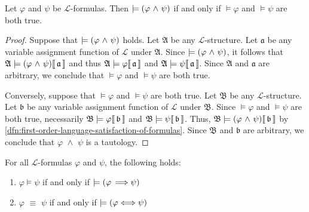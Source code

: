 \begin{thm}
     \label{thm:first-order-language-tautological-conjuncts-iff-tautological-conjunction}
    Let \( \varphi \) and \( \psi \) be \( \mathcal{L} \)-formulas. Then \( \models \mleft( \varphi \,\,{\land}\,\, \psi \mright) \) if and only if
    \( \models \varphi \) and \( \models \psi \) are both true.
\end{thm}

\begin{proof}
    Suppose that \( \models \mleft( \varphi \,\,{\land}\,\, \psi \mright) \) holds.
    Let \( \mathfrak{A} \) be any \( \mathcal{L} \)-structure.
    Let \( \mathfrak{a} \) be any variable assignment function of \( \mathcal{L} \) under \( \mathfrak{A} \).
    Since \( \models \mleft( \varphi \,\,{\land}\,\, \psi \mright) \),
    it follows that \( \folwffsatisfaction{\mathfrak{A}}{\mleft( \varphi \,\,{\land}\,\, \psi \mright)}{\mathfrak{a}} \)
    and thus \(  \mathfrak{A} \models \varphi\llbracket\, \mathfrak{a} \,\rrbracket \) and \(  \mathfrak{A} \models \psi\llbracket\, \mathfrak{a} \,\rrbracket \).
    Since \( \mathfrak{A} \) and \( \mathfrak{a} \) are arbitrary, we conclude that \( \models \varphi \) and \( \models \psi \) are both true.

    \vspace{0.3cm}
    \noindent
    Conversely, suppose that \( \models \varphi \) and \( \models \psi \) are both true.
    Let \( \mathfrak{B} \) be any \( \mathcal{L} \)-structure.
    Let \( \mathfrak{b} \) be any variable assignment function of \( \mathcal{L} \) under \( \mathfrak{B} \).
    Since \( \models \varphi \) and \( \models \psi \) are both true, necessarily \(  \mathfrak{B} \models \varphi\llbracket\, \mathfrak{b} \,\rrbracket \)
    and \(  \mathfrak{B} \models \psi\llbracket\, \mathfrak{b} \,\rrbracket \).
    Thus, \( \folwffsatisfaction{\mathfrak{B}}{\mleft( \varphi \,\,{\land}\,\, \psi \mright)}{\mathfrak{b}} \)
    by \cref{dfn:first-order-language-satisfaction-of-formulas}.
    Since \( \mathfrak{B} \) and \( \mathfrak{b} \) are arbitrary, we conclude that \( \varphi \,\,{\land}\,\, \psi \) is a tautology.
\end{proof}

\begin{thm}
     \label{thm:first-order-language-equivalent-formulations-of-logical-consequence-and-logical-equivalence}
    For all \( \mathcal{L} \)-formulas \( \varphi \) and \( \psi \), the following holds:
    \begin{enumerate}[topsep=2pt,label=\textup{\texttt{(\alph*)}}]
        \item \( \varphi \models \psi \) if and only if \( \models \mleft( \varphi \,{\implies} \psi \mright) \)  \label{enum:logical-consequence-iff-tautological-implication}
        \item \( \varphi \,\,{\equiv}\,\, \psi \) if and only if \( \models \mleft( \varphi {\iff} \psi \mright) \)  \label{enum:logical-equivalence-iff-tautological-biconditional}
    \end{enumerate}
\end{thm}

